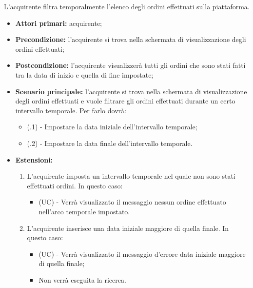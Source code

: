 L'acquirente filtra temporalmente l'elenco degli ordini effettuati sulla piattaforma.
\begin{itemize}
    \item \textbf{Attori primari:} acquirente;
    \item \textbf{Precondizione:} l'acquirente si trova nella schermata di visualizzazione degli ordini effettuati;
    \item \textbf{Postcondizione:} l'acquirente visualizzerà tutti gli ordini che sono stati fatti tra la data di inizio e quella di fine impostate;
    \item \textbf{Scenario principale:} l'acquirente si trova nella schermata di visualizzazione degli ordini effettuati e vuole filtrare gli ordini effettuati durante un certo intervallo temporale. Per farlo dovrà:
    \begin{itemize}
        \item (\actualUC.1) - Impostare la data iniziale dell'intervallo temporale;
        \item (\actualUC.2) - Impostare la data finale dell'intervallo temporale.
    \end{itemize}
    \item \textbf{Estensioni:}
    \begin{enumerate}[label=\lett]
        \item L'acquirente imposta un intervallo temporale nel quale non sono stati effettuati ordini. In questo caso:
        \begin{itemize}
            \item (UC) - Verrà visualizzato il messaggio nessun ordine effettuato nell'arco temporale impostato.
        \end{itemize}
        \item L'acquirente inserisce una data iniziale maggiore di quella finale. In questo caso:
        \begin{itemize}
            \item (UC) - Verrà visualizzato il messaggio d'errore data iniziale maggiore di quella finale;
            \item Non verrà eseguita la ricerca.
        \end{itemize}
    \end{enumerate}
\end{itemize}

\resetSubUC

